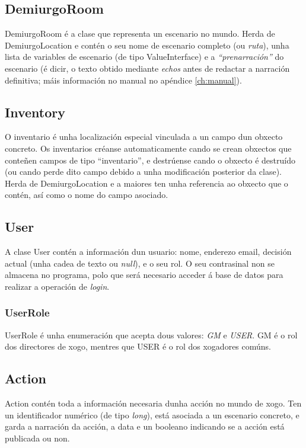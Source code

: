 \subsection{DemiurgoRoom}
DemiurgoRoom é a clase que representa un escenario no mundo. Herda de
DemiurgoLocation e contén o seu nome de escenario completo (ou \textit{ruta}),
unha lista de variables de escenario (de tipo ValueInterface) e a
\textit{``prenarración''} do escenario (é dicir, o texto obtido mediante
\textit{echos} antes de redactar a narración definitiva; máis información no
manual no apéndice \ref{ch:manual}).

\subsection{Inventory}
O inventario é unha localización especial vinculada a un campo dun obxecto
concreto. Os inventarios créanse automaticamente cando se crean obxectos que
conteñen campos de tipo ``inventario'', e destrúense cando o obxecto é
destruído (ou cando perde dito campo debido a unha modificación posterior da
clase). Herda de DemiurgoLocation e a maiores ten unha referencia ao obxecto que
o contén, así como o nome do campo asociado.

\subsection{User}
A clase User contén a información dun usuario: nome, enderezo email, decisión
actual (unha cadea de texto ou \textit{null}), e o seu rol. O seu contrasinal
non se almacena no programa, polo que será necesario acceder á base de datos
para realizar a operación de \textit{login}.

\subsubsection{UserRole}
UserRole é unha enumeración que acepta dous valores: \textit{GM} e
\textit{USER}. GM é o rol dos directores de xogo, mentres que USER é o rol dos
xogadores comúns.

\subsection{Action}
Action contén toda a información necesaria dunha acción no mundo de xogo.
Ten un identificador numérico (de tipo \textit{long}), está asociada a un
escenario concreto, e garda a narración da acción, a data e un booleano
indicando se a acción está publicada ou non.

